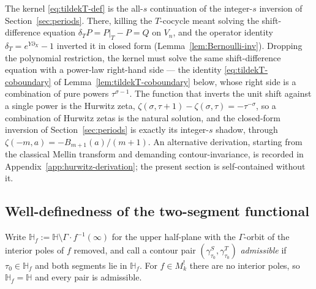 \documentclass[11pt]{article}
\numberwithin{equation}{section}  %
\newcommand{\HH}{\mathbb{H}}
\begin{document}
The kernel \eqref{eq:tildekT-def} is the all-$s$ continuation of the
integer-$s$ inversion of Section~\ref{sec:periods}.  There, killing the
$T$-cocycle meant solving the shift-difference equation
$\delta_T P = P|_T - P = Q$ on $V_n$, and the operator identity
$\delta_T = e^{Y\partial_X} - 1$ inverted it in closed form
(Lemma~\ref{lem:Bernoulli-inv}).  Dropping the polynomial restriction,
the kernel must solve the same shift-difference equation with a
power-law right-hand side --- the identity
\eqref{eq:tildekT-coboundary} of
Lemma~\ref{lem:tildekT-coboundary} below, whose right side is a
combination of pure powers $\tau^{\sigma - 1}$.  The function that
inverts the unit shift against a single power is the Hurwitz zeta,
$\zeta(\sigma, \tau + 1) - \zeta(\sigma, \tau) = -\tau^{-\sigma}$, so a
combination of Hurwitz zetas is the natural solution, and the
closed-form inversion of Section~\ref{sec:periods} is exactly its integer-$s$
shadow, through $\zeta(-m, a) = -B_{m+1}(a)/(m+1)$.  An alternative
derivation, starting from the classical Mellin transform and demanding
contour-invariance, is recorded in
Appendix~\ref{app:hurwitz-derivation}; the present section is
self-contained without it.

\subsection{Well-definedness of the two-segment functional}\label{subsec:well-defined}

Write $\HH_f := \HH \setminus \Gamma\!\cdot\! f^{-1}(\infty)$ for the
upper half-plane with the $\Gamma$-orbit of the interior poles of $f$
removed, and call a contour pair
$(\gamma^S_{\tau_0}, \gamma^T_{\tau_0})$ \emph{admissible} if
$\tau_0 \in \HH_f$ and both segments lie in $\HH_f$.  For
$f \in M^!_k$ there are no interior poles, so $\HH_f = \HH$ and every
pair is admissible.
\end{document}
